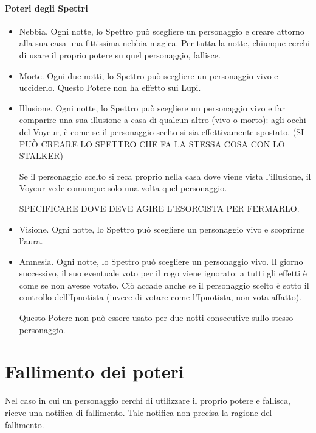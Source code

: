 \documentclass[a4paper,10pt]{article}
\begin{document}
\paragraph{Poteri degli Spettri}

\begin{itemize}
 \item Nebbia. Ogni notte, lo Spettro può scegliere un personaggio e creare attorno alla sua casa una fittissima nebbia magica. Per tutta la notte, chiunque cerchi di usare il proprio potere su quel personaggio, fallisce.
 
 \item Morte. Ogni due notti, lo Spettro può scegliere un personaggio vivo e ucciderlo. Questo Potere non ha effetto sui Lupi.
 
 \item Illusione. Ogni notte, lo Spettro può scegliere un personaggio vivo e far comparire una sua illusione a casa di qualcun altro (vivo o morto): agli occhi del Voyeur, è come se il personaggio scelto si sia effettivamente spostato. (SI PUÒ CREARE LO SPETTRO CHE FA LA STESSA COSA CON LO STALKER)
 
 Se il personaggio scelto si reca proprio nella casa dove viene vista l'illusione, il Voyeur vede comunque solo una volta quel personaggio.
 
 SPECIFICARE DOVE DEVE AGIRE L'ESORCISTA PER FERMARLO.
 
 \item Visione. Ogni notte, lo Spettro può scegliere un personaggio vivo e scoprirne l'aura.
 
 \item Amnesia. Ogni notte, lo Spettro può scegliere un personaggio vivo. Il giorno successivo, il suo eventuale voto per il rogo viene ignorato: a tutti gli effetti è come se non avesse votato. Ciò accade anche se il personaggio scelto è sotto il controllo dell'Ipnotista (invece di votare come l'Ipnotista, non vota affatto).
 
 Questo Potere non può essere usato per due notti consecutive sullo stesso personaggio.
\end{itemize}


\section{Fallimento dei poteri}

Nel caso in cui un personaggio cerchi di utilizzare il proprio potere e fallisca, riceve una notifica di fallimento. Tale notifica non precisa la ragione del fallimento.
\end{document}
